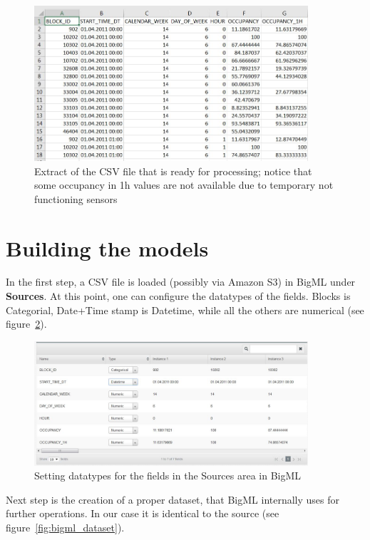 \documentclass{article}
\begin{document}
\begin{figure}[!ht]
    \centering
    \includegraphics[width=4.0in]{dataset_screenshot.jpg}
    \caption{Extract of the CSV file that is ready for processing; notice that some occupancy in 1h values are not available due to temporary not functioning sensors}
    \label{fig:dataset_screenshot}
\end{figure}

\section{Building the models}
\label{sec:Building_the_models}
In the first step, a CSV file is loaded (possibly via Amazon S3) in BigML under \textbf{Sources}. At this point, one can configure the datatypes of the fields. Blocks is Categorial, Date+Time stamp is Datetime, while all the others are numerical (see figure~\ref{fig:bigml_source_field_datatypes}). 
\vspace{2mm}

\begin{figure}[!ht]
    \centering
    \includegraphics[width=4.0in]{bigml_source_field_datatypes.jpg}
    \caption{Setting datatypes for the fields in the Sources area in BigML}
    \label{fig:bigml_source_field_datatypes}
\end{figure}

Next step is the creation of a proper dataset, that BigML internally uses for further operations. In our case it is identical to the source (see figure~\ref{fig:bigml_dataset}).
\vspace{2mm}
\end{document}
